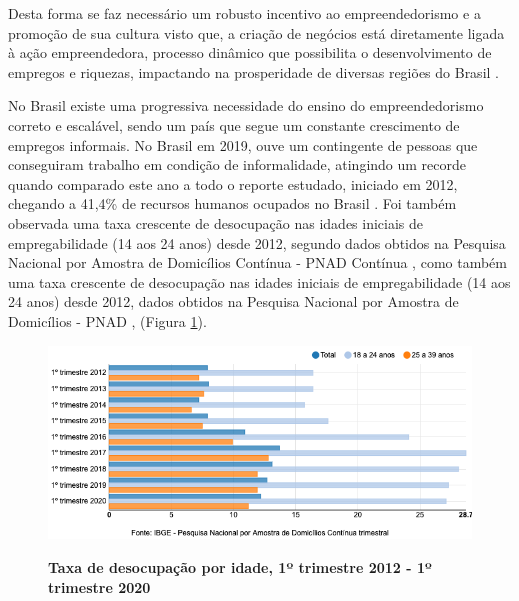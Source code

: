 Desta forma se faz necessário um robusto incentivo ao empreendedorismo e a promoção de sua cultura visto que, a criação de negócios está diretamente ligada à ação empreendedora, processo dinâmico que possibilita o desenvolvimento de empregos e riquezas, impactando na prosperidade de diversas regiões do Brasil \cite{leite_aprendizagem_2015}.

No Brasil existe uma progressiva necessidade do ensino do empreendedorismo correto e escalável, sendo um país que segue um constante crescimento de empregos informais. No Brasil em 2019, ouve um contingente de pessoas que conseguiram trabalho em condição de informalidade, atingindo um recorde quando comparado este ano a todo o reporte estudado, iniciado em 2012, chegando a 41,4\% de recursos humanos ocupados no Brasil \cite{ibge_informalidade_2019}. Foi também observada uma taxa crescente de desocupação nas idades iniciais de empregabilidade (14 aos 24 anos) desde 2012, segundo dados obtidos na Pesquisa Nacional por Amostra de Domicílios Contínua - PNAD Contínua  \cite{ibge_informalidade_2019}, como também uma taxa crescente de desocupação nas idades iniciais de empregabilidade (14 aos 24 anos) desde 2012, dados obtidos na Pesquisa Nacional por Amostra de Domicílios - PNAD \cite{ibge_pesquisa_2019}, (Figura \ref{taxa_ocupacao}). 


\begin{figure}[H]
\centering
\caption{\textbf{Taxa de desocupação por idade, 1º trimestre 2012 - 1º trimestre 2020}}
\includegraphics[scale=0.6]{Imagens/taxa_desocupacao.png}
\label{taxa_ocupacao}
\end{figure}

